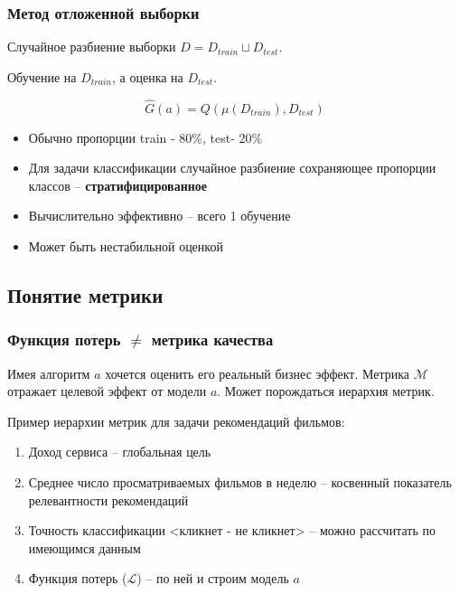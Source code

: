 \documentclass{beamer}
\begin{document}
	\begin{frame}
		\frametitle{Метод отложенной выборки}
		Случайное разбиение выборки $D = D_{train} \sqcup D_{test}$.
		
		Обучение на $D_{train}$, а оценка на $D_ {test}$.
		
		\[
		\hat{G}(a) = Q(\mu(D_{train}), D_{test})
		\]
		
		\begin{itemize}
		\item Обычно пропорции train - 80\%, test- 20\%		
		\item Для задачи классификации случайное разбиение сохраняющее пропорции классов -- \textbf{стратифицированное}
		\item Вычислительно эффективно -- всего 1 обучение
		\item Может быть нестабильной оценкой
		\end{itemize}
	\end{frame}
	
	\subsection{Понятие метрики}
		
	\begin{frame}
		\frametitle{Функция потерь $\ne$ метрика качества}
		Имея алгоритм $a$ хочется оценить его реальный бизнес эффект. Метрика $\mathcal{M}$ отражает целевой эффект от модели $a$. Может порождаться иерархия метрик.
		
		\vspace{15pt}
		
		Пример иерархии метрик для задачи рекомендаций фильмов:
		\begin{enumerate}
			\item Доход сервиса -- глобальная цель
			\item Среднее число просматриваемых фильмов в неделю -- косвенный показатель релевантности рекомендаций
			\item Точность классификации <кликнет - не кликнет> -- можно рассчитать по имеющимся данным
			\item Функция потерь ($\mathcal{L}$) -- по ней и строим модель $a$
		\end{enumerate}
	\end{frame}
	
\end{document}
